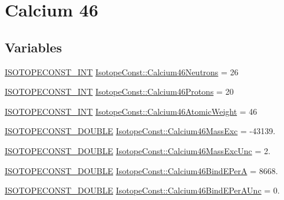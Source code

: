 \hypertarget{group___isotope_const-_calcium-_ca46}{}\section{Calcium 46}
\label{group___isotope_const-_calcium-_ca46}
\subsection*{Variables}
\begin{DoxyCompactItemize}
\item 
\mbox{\hyperlink{group___isotope_const-_macros_ga5f18360b3e99483a35c32d789e62621c}{I\+S\+O\+T\+O\+P\+E\+C\+O\+N\+S\+T\+\_\+\+I\+NT}} \mbox{\hyperlink{group___isotope_const-_calcium-_ca46_ga3702e9c6374a68bec9abf13266755795}{Isotope\+Const\+::\+Calcium46\+Neutrons}} = 26
\item 
\mbox{\hyperlink{group___isotope_const-_macros_ga5f18360b3e99483a35c32d789e62621c}{I\+S\+O\+T\+O\+P\+E\+C\+O\+N\+S\+T\+\_\+\+I\+NT}} \mbox{\hyperlink{group___isotope_const-_calcium-_ca46_gaa5333454f2bf98fdbdb0a2654318e68e}{Isotope\+Const\+::\+Calcium46\+Protons}} = 20
\item 
\mbox{\hyperlink{group___isotope_const-_macros_ga5f18360b3e99483a35c32d789e62621c}{I\+S\+O\+T\+O\+P\+E\+C\+O\+N\+S\+T\+\_\+\+I\+NT}} \mbox{\hyperlink{group___isotope_const-_calcium-_ca46_ga6ea454076e837c38dc4daa98c6fd986a}{Isotope\+Const\+::\+Calcium46\+Atomic\+Weight}} = 46
\item 
\mbox{\hyperlink{group___isotope_const-_macros_ga8f45a7272ce02c0b4c65c44636ed719a}{I\+S\+O\+T\+O\+P\+E\+C\+O\+N\+S\+T\+\_\+\+D\+O\+U\+B\+LE}} \mbox{\hyperlink{group___isotope_const-_calcium-_ca46_ga8d33e0bee71313e13b5ec1ad1f0f6b0b}{Isotope\+Const\+::\+Calcium46\+Mass\+Exc}} = -\/43139.
\item 
\mbox{\hyperlink{group___isotope_const-_macros_ga8f45a7272ce02c0b4c65c44636ed719a}{I\+S\+O\+T\+O\+P\+E\+C\+O\+N\+S\+T\+\_\+\+D\+O\+U\+B\+LE}} \mbox{\hyperlink{group___isotope_const-_calcium-_ca46_ga644045e034f11df5fd7b89ecdda44658}{Isotope\+Const\+::\+Calcium46\+Mass\+Exc\+Unc}} = 2.
\item 
\mbox{\hyperlink{group___isotope_const-_macros_ga8f45a7272ce02c0b4c65c44636ed719a}{I\+S\+O\+T\+O\+P\+E\+C\+O\+N\+S\+T\+\_\+\+D\+O\+U\+B\+LE}} \mbox{\hyperlink{group___isotope_const-_calcium-_ca46_gabf725ad48317b98d8d2355cae96044fa}{Isotope\+Const\+::\+Calcium46\+Bind\+E\+PerA}} = 8668.
\item 
\mbox{\hyperlink{group___isotope_const-_macros_ga8f45a7272ce02c0b4c65c44636ed719a}{I\+S\+O\+T\+O\+P\+E\+C\+O\+N\+S\+T\+\_\+\+D\+O\+U\+B\+LE}} \mbox{\hyperlink{group___isotope_const-_calcium-_ca46_gab7d7cd697a16dc4f83fb9f0e2a7aec6a}{Isotope\+Const\+::\+Calcium46\+Bind\+E\+Per\+A\+Unc}} = 0.

\end{DoxyCompactItemize}

